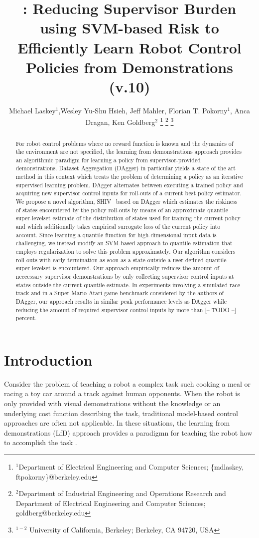 \documentclass[10pt, conference]{ieeeconf}      %
\title{\LARGE \bf \acro: Reducing Supervisor Burden using SVM-based Risk to Efficiently Learn Robot Control Policies
from Demonstrations {\color{blue}(v.10)} }
\author{Michael Laskey$^1$,Wesley Yu-Shu Hsieh, Jeff Mahler, Florian T. Pokorny$^1$, Anca Dragan, Ken Goldberg$^2$%
\thanks{$^1$Department of Electrical Engineering and Computer Sciences; {\small \{mdlaskey, ftpokorny\}@berkeley.edu}}%
\thanks{$^2$Department of Industrial Engineering and Operations Research and Department of Electrical Engineering and Computer Sciences; {\small goldberg@berkeley.edu}}%
\thanks{$^{1-2}$ University of California, Berkeley;  Berkeley, CA 94720, USA}%
}
\newcommand{\acro}{SHIV}
\begin{document}
\maketitle
\thispagestyle{empty}
\pagestyle{empty}



\begin{abstract}
For robot control problems where no reward function is known and the dynamics of the environment are not specified, the
learning from demonstrations approach provides an algorithmic paradigm for learning a policy from supervisor-provided
demonstrations. Dataset Aggregation (DAgger) in particular yields a state of the art method in this context which treats
the problem of determining a policy as an iterative supervised learning problem. DAgger alternates between executing a
trained policy and acquiring new supervisor control inputs for roll-outs of a current best policy estimator. 
We propose a novel algorithm, \acro~ based on DAgger which estimates the riskiness of states
encountered by the policy roll-outs by means of an approximate quantile super-levelset estimate of the distribution of
states used for training the current policy and which additionally takes empirical surrogate loss of the current policy
into account. Since learning a quantile function for high-dimensional input data is
challenging, we instead modify an SVM-based approach to quantile estimation that employs regularization to solve this
problem approximately. Our algorithm considers roll-outs with early termination as soon as a state outside a
user-defined quantile super-levelset is encountered. Our approach empirically reduces the amount of neccessary
supervisor demonstrations by only collecting supervisor control inputs at states outside the current quantile estimate.
In experiments involving a simulated race track and in a Super Mario Atari game benchmark considered by the authors of
DAgger, our approach results in similar peak performance levels as DAgger while reducing the amount of required supervisor
control inputs by more than {\color{blue}[-- TODO --]} percent.
\end{abstract}



\section{Introduction} 
Consider the problem of teaching a robot a complex task such cooking a meal or racing a toy car around a track
against human opponents. When the robot is only provided with visual demonstrations without the knowledge or an
underlying cost function describing the task, traditional model-based control approaches are often not applicable. In
these situations, the learning from demonstrations (LfD) approach provides a paradigmn for teaching the robot how to
accomplish the task \cite{ross2013learning,pomerleau1989alvinn,schulman2013case}.
\end{document}
